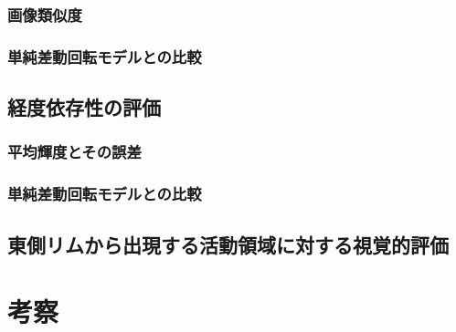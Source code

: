       \subsubsection{画像類似度}
      \subsubsection{単純差動回転モデルとの比較}
      \subsection{経度依存性の評価}
        \subsubsection{平均輝度とその誤差}
        \subsubsection{単純差動回転モデルとの比較}
    \subsection{東側リムから出現する活動領域に対する視覚的評価}
  \section{考察}

